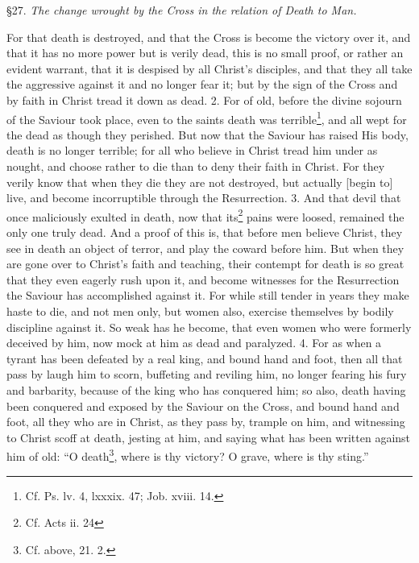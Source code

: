 
§27. \emph{The change wrought by the Cross in the relation of Death to Man.}

For that death is destroyed, and that the Cross is become the victory over it, and that it has no more power but is verily dead, this is no small proof, or rather an evident warrant, that it is despised by all Christ’s disciples, and that they all take the aggressive against it and no longer fear it; but by the sign of the Cross and by faith in Christ tread it down as dead. 2. For of old, before the divine sojourn of the Saviour took place, even to the saints death was terrible\footnote{Cf. Ps. lv. 4, lxxxix. 47; Job. xviii. 14.}, and all wept for the dead as though they perished. But now that the Saviour has raised His body, death is no longer terrible; for all who believe in Christ tread him under as nought, and choose rather to die than to deny their faith in Christ. For they verily know that when they die they are not destroyed, but actually [begin to] live, and become incorruptible through the Resurrection. 3. And that devil that once maliciously exulted in death, now that its\footnote{Cf. Acts ii. 24} pains were loosed, remained the only one truly dead. And a proof of this is, that before men believe Christ, they see in death an object of terror, and play the coward before him. But when they are gone over to Christ’s faith and teaching, their contempt for death is so great that they even eagerly rush upon it, and become witnesses for the Resurrection the Saviour has accomplished against it. For while still tender in years they make haste to die, and not men only, but women also, exercise themselves by bodily discipline against it. So weak has he become, that even women who were formerly deceived by him, now mock at him as dead and paralyzed. 4. For as when a tyrant has been defeated by a real king, and bound hand and foot, then all that pass by laugh him to scorn, buffeting and reviling him, no longer fearing his fury and barbarity, because of the king who has conquered him; so also, death having been conquered and exposed by the Saviour on the Cross, and bound hand and foot, all they who are in Christ, as they pass by, trample on him, and witnessing to Christ scoff at death, jesting at him, and saying what has been written against him of old: “O death\footnote{Cf. above, 21. 2.}, where is thy victory? O grave, where is thy sting.”


